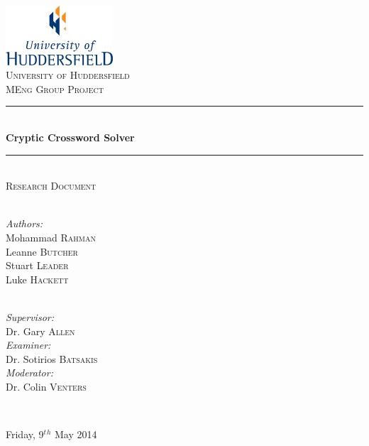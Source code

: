 \newcommand{\HRule}{\rule{\linewidth}{0.5mm}}

\begin{titlepage}
  \begin{center}

  \includegraphics[width=0.3\textwidth]{../UoHLogo.jpg} \\[2.5cm]

  \textsc{\LARGE University of Huddersfield} \\[1.5cm]

  \textsc{\Large MEng Group Project} \\[0.75cm]

  \HRule \\[0.4cm]
    { \huge \bfseries Cryptic Crossword Solver }
  \\[0.1cm]

  \HRule \\[0.75cm]

  \textsc{\Large Research Document} \\[2cm]

  \begin{minipage}{0.4\textwidth}
    \begin{flushleft} \large  ~\\
      \emph{Authors:}          \\[0.5ex]
      Mohammad \textsc{Rahman} \\[0.5ex]
      Leanne \textsc{Butcher}  \\[0.5ex]
      Stuart \textsc{Leader}   \\[0.5ex]
      Luke \textsc{Hackett} 
    \end{flushleft}
  \end{minipage}
  \begin{minipage}{0.4\textwidth}
    \begin{flushright} \large ~\\
      \emph{Supervisor:} \\ 
      Dr. Gary \textsc{Allen}
      ~\\[1ex]
      \emph{Examiner:} \\
      Dr. Sotirios \textsc{Batsakis}
      ~\\[1ex]
      \emph{Moderator:} \\
      Dr. Colin \textsc{Venters} 
    \end{flushright}
  \end{minipage}

  ~\\[0.01cm]


  \vfill

  {\large Friday, 9$^t$$^h$ May 2014}

  \end{center}
\end{titlepage}
